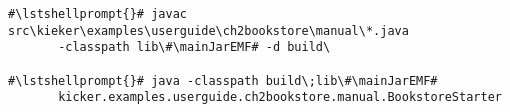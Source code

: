 \begin{lstlisting}[caption=Commands to compile and run the instrumented Bookstore under Windows,label=lst:bookstoreStarterWin]
#\lstshellprompt{}# javac src\kieker\examples\userguide\ch2bookstore\manual\*.java  
       -classpath lib\#\mainJarEMF# -d build\

#\lstshellprompt{}# java -classpath build\;lib\#\mainJarEMF#
       kicker.examples.userguide.ch2bookstore.manual.BookstoreStarter
\end{lstlisting}
